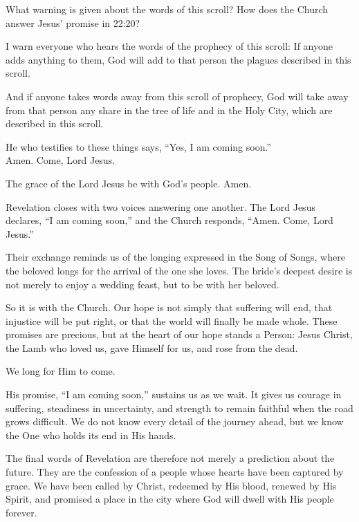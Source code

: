 \begin{ScriptureBox2}{What warning is given about the words of this scroll? How does the Church answer Jesus' promise in 22:20?}

\item[22:18] I warn everyone who hears the words of the prophecy of this scroll: If anyone adds anything to them, God will add to that person the plagues described in this scroll.

\item[22:19] And if anyone takes words away from this scroll of prophecy, God will take away from that person any share in the tree of life and in the Holy City, which are described in this scroll.

\item[22:20] He who testifies to these things says, ``Yes, I am coming soon.''\\
Amen. Come, Lord Jesus.

\item[22:21] The grace of the Lord Jesus be with God's people. Amen.

\end{ScriptureBox2}

Revelation closes with two voices answering one another. The Lord Jesus declares, ``I am coming soon,'' and the Church responds, ``Amen. Come, Lord Jesus.''

Their exchange reminds us of the longing expressed in the Song of Songs, where the beloved longs for the arrival of the one she loves. The bride's deepest desire is not merely to enjoy a wedding feast, but to be with her beloved.

So it is with the Church. Our hope is not simply that suffering will end, that injustice will be put right, or that the world will finally be made whole. These promises are precious, but at the heart of our hope stands a Person: Jesus Christ, the Lamb who loved us, gave Himself for us, and rose from the dead.

We long for Him to come.

His promise, ``I am coming soon,'' sustains us as we wait. It gives us courage in suffering, steadiness in uncertainty, and strength to remain faithful when the road grows difficult. We do not know every detail of the journey ahead, but we know the One who holds its end in His hands.

The final words of Revelation are therefore not merely a prediction about the future. They are the confession of a people whose hearts have been captured by grace. We have been called by Christ, redeemed by His blood, renewed by His Spirit, and promised a place in the city where God will dwell with His people forever.

